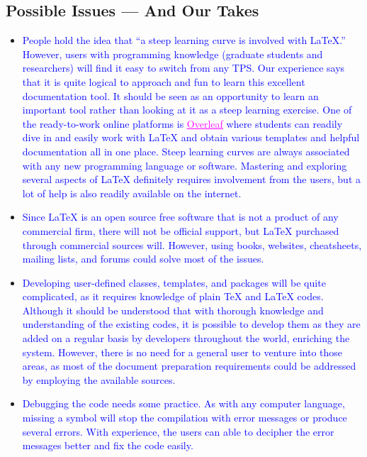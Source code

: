 \documentclass[phd,showframe]{ndsu-thesis-2022}
\newcommand\italk[1]{\textcolor{blue}{#1}}  %
\newcommand\lx{\LaTeX\xspace}
\newcommand\tx{\TeX\xspace}
\begin{document}
\mysectop
\subsection{Possible Issues --- And Our Takes}
\begin{itemize}[leftmargin=*, itemsep=0pt, parsep=3pt] 
\item \italk{People hold the idea that ``a steep learning curve is involved with \lx.'' However, users with programming knowledge (graduate students and researchers) will find it easy to switch from any TPS. Our experience says that it is quite logical to approach and fun to learn this excellent documentation tool. It should be seen as an opportunity to learn an important tool rather than looking at it as a steep learning exercise. One of the ready-to-work online platforms is \href{https://www.overleaf.com/login}{\textcolor{magenta}{\underline{Overleaf}}} where students can readily dive in and easily work with \lx and obtain various templates and helpful documentation all in one place. Steep learning curves are always associated with any new programming language or software. Mastering and exploring several aspects of \lx definitely requires involvement from the users, but a lot of help is also readily available on the internet.}   

\item \italk{Since \lx is an open source free software that is not a product of any commercial firm, there will not be official support, but \lx purchased through commercial sources will. However, using books, websites, cheatsheets, mailing lists, and forums could solve most of the issues.} 

\item \italk{Developing user-defined classes, templates, and packages will be quite complicated, as it requires knowledge of plain \tx and \lx codes. Although it should be understood that with thorough knowledge and understanding of the existing codes, it is possible to develop them as they are added on a regular basis by developers throughout the world, enriching the system. However, there is no need for a general user to venture into those areas, as most of the document preparation requirements could be addressed by employing the available sources.} 

\item \italk{Debugging the code needs some practice. As with any computer language, missing a symbol will stop the compilation with error messages or produce several errors. With experience, the users can able to decipher the error messages better and fix the code easily.}  


\end{itemize}
\end{document}
